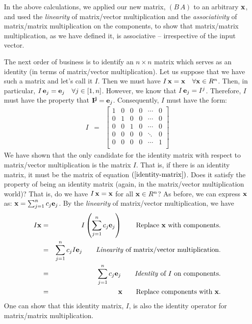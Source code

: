 \documentclass{article}
\begin{document}
In the above calculations, we applied our new matrix, $(B \, A)$ to an arbitrary ${\bf x}$, and 
used the {\em linearity\/} of matrix/vector multiplication and the {\em associativity\/}
of matrix/matrix multiplication on the components, to show that matrix/matrix
multiplication, as we have defined it, is associative -- irrespective of the input vector.

The next order of business is to identify an $n \times n$ matrix which serves as an
identity (in terms of matrix/vector multiplication).
Let us suppose that we have such a matrix and let's call it $I$.
Then we must have $I \, {\bf x} = {\bf x} \quad \forall {\bf x} \in R^n$. 
Then, in particular,  
$I \, {\bf e}_{j} = {\bf e}_j \quad \forall j \in [1, n]$. 
However, we know that $I \, {\bf e}_j = I^j$. Therefore, $I$
must have the property that ${\bf I^j} = {\bf e}_j$. Consequently, $I$ must have the form:
\begin{eqnarray}
  I & = & \left[
      \begin{array}{cccccc}
        1 & 0 & 0 & 0 & \cdots & 0 \\
        0 & 1 & 0 & 0 & \cdots & 0 \\
        0 & 0 & 1 & 0 & \cdots & 0 \\
        0 & 0 & 0 & 0 & \ddots & 0 \\
        0 & 0 & 0 & 0 & \cdots & 1 \\
      \end{array}
  \right] \label{identity-matrix}
\end{eqnarray}
We have shown that the only candidate for the identity matrix with respect to 
matrix/vector multiplication is the matrix $I$. That is, if there is an 
identity matrix, it must be the matrix of equation $(\ref{identity-matrix})$. Does it satisfy
the property of being an identity matrix (again, in the matrix/vector multiplication world)?
That is, do we have $I \, {\bf x} = {\bf x}$ for all ${\bf x} \in R^n$?
As before, we can express ${\bf x}$ as: ${\bf x} = \sum_{j=1}^n c_j {\bf e}_j$.
By the {\em linearity\/} of matrix/vector multiplication, we have
\begin{eqnarray}
	I {\bf x} & = & I\left( \sum_{j=1}^n c_j {\bf e}_j \right)  \quad\quad \text{Replace ${\bf x}$ with components.} \nonumber \\
							 & = & \sum_{j=1}^n c_j  I{\bf e}_j \quad\quad \text{{\em Linearity\/} of matrix/vector multiplication.} \nonumber \\
							 & = & \sum_{j=1}^n c_j {\bf e}_j \quad\quad \text{{\em Identity\/} of $I$ on components.}\nonumber \\
							 & = & {\bf x} \quad\quad \text{Replace components with ${\bf x}$.}
\end{eqnarray}
One can show that this identity matrix, $I$, is also the identity operator for
matrix/matrix multiplication.
\end{document}
